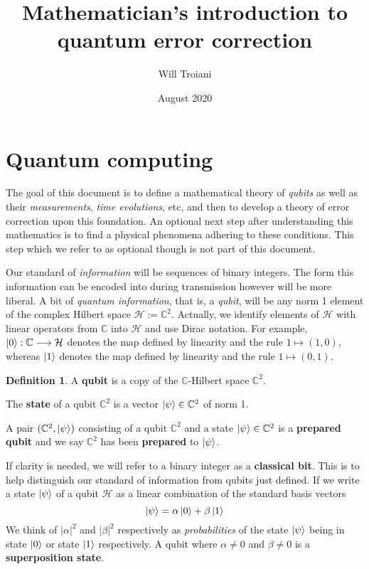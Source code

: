 \documentclass[12pt]{article}
\title{Mathematician's introduction to quantum error correction}
\author{Will Troiani}
\date{August 2020}
\theoremstyle{plain}
\theoremstyle{definition}
\newtheorem{defn}[thm]{Definition} %
\newcommand{\bb}[1]{\mathbb{#1}}
\newcommand{\call}[1]{\mathcal{#1}}
\newcommand{\lto}{\longrightarrow}
\begin{document}
	
	\maketitle
	\tableofcontents
	
	\section{Quantum computing}\label{sec:quantum_computing}
	The goal of this document is to define a mathematical theory of \emph{qubits} as well as their \emph{measurements}, \emph{time evolutions}, etc, and then to develop a theory of error correction upon this foundation. An optional next step after understanding this mathematics is to find a physical phenomena adhering to these conditions. This step which we refer to as optional though is not part of this document.
	
	Our standard of \emph{information} will be sequences of binary integers. The form this information can be encoded into during transmission however will be more liberal. A bit of \emph{quantum information}, that is, a \emph{qubit}, will be any norm 1 element of the complex Hilbert space $\call{H} := \bb{C}^2$. Actually, we identify elements of $\call{H}$ with linear operators from $\bb{C}$ into $\call{H}$ and use Dirac notation. For example, $\ket{0}: \bb{C} \lto \call{H}$ denotes the map defined by linearity and the rule $1 \longmapsto (1,0)$, whereas $\ket{1}$ denotes the map defined by linearity and the rule $1 \longmapsto (0,1)$.
	\begin{defn}\label{def:qubit}
		A \textbf{qubit} is a copy of the $\bb{C}$-Hilbert space $\bb{C}^2$.
		
		The \textbf{state} of a qubit $\bb{C}^2$ is a vector $\ket{\psi} \in \bb{C}^2$ of norm 1.
		
		A pair $(\bb{C}^2,\ket{\psi})$ consisting of a qubit $\bb{C}^2$ and a state $\ket{\psi} \in \bb{C}^2$ is a \textbf{prepared qubit} and we say $\bb{C}^2$ has been \textbf{prepared} to $\ket{\psi}$.
		\end{defn}
	If clarity is needed, we will refer to a binary integer as a \textbf{classical bit}. This is to help distinguish our standard of information from qubits just defined. If we write a state $\ket{\psi}$ of a qubit $\call{H}$ as a linear combination of the standard basis vectors
\begin{equation}
	\ket{\psi} = \alpha\ket{0} + \beta\ket{1}
	\end{equation}
	We think of $|\alpha|^2$ and $|\beta|^2$ respectively as \emph{probabilities} of the state $\ket{\psi}$ being in state $\ket{0}$ or state $\ket{1}$ respectively. A qubit where $\alpha \neq 0$ and $\beta \neq 0$ is a \textbf{superposition state}.
	
\end{document}

